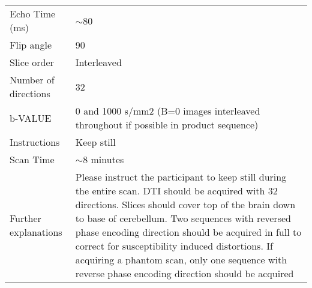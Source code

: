 \documentclass[
	a4paper, 
	11.5pt,
	headings=small, 
	twoside, 
	titlepage=firstiscover, 
 	pagesize=auto,
  	version=last,
	open=any,
	BCOR=14mm,
  	chapterprefix=false]{scrbook}
\begin{document}
\begin{table}[H]
\begin{tabularx}{1\textwidth}{@{}X *{1}{X}@{}}
Echo Time (ms)            							& $\sim$80                                                                             \\
Flip angle                								& 90                                                                                   \\
Slice order               								& Interleaved                                                                          \\
Number of directions      						& 32                                                                                   \\
b-VALUE                   								& 0 and 1000 s/mm2 (B=0 images interleaved throughout if possible in product sequence) \\
Instructions              							& Keep still                                                                           \\
Scan Time                 								& $\sim$8 minutes                                                                      \\
Further explanations      						& Please instruct the participant to keep still during the entire scan. \ac{DTI} should be acquired with 32 directions. Slices should cover top of the brain down to base of cerebellum. Two sequences with reversed phase encoding direction should be acquired in full to correct for susceptibility induced distortions. If acquiring a phantom scan, only one sequence with reverse phase encoding direction should be acquired                                                                                     
\end{tabularx}
\end{table}
\end{document}
